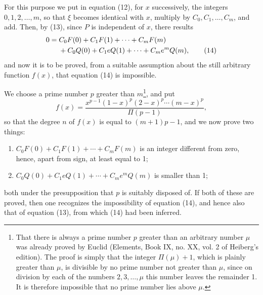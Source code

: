 \documentclass[11pt]{article}
\begin{document}
For this purpose we put in equation (12), for $x$ successively, the integers $0,1,2,\ldots,m$, so that $\xi$ becomes identical with $x$, multiply by $C_0,C_1,\ldots,C_m$, and add. Then, by (13), since $P$ is independent of $x$, there results
\begin{align}
0={}&C_0F(0)+C_1F(1)+\cdots+C_mF(m)\notag\\
&+C_0Q(0)+C_1eQ(1)+\cdots+C_me^mQ(m),\tag{14}
\end{align}
and now it is to be proved, from a suitable assumption about the still arbitrary function $f(x)$, that equation (14) is impossible.

We choose a prime number $p$ greater than $m$\footnote{That there is always a prime number $p$ greater than an arbitrary number $\mu$ was already proved by Euclid (Elements, Book IX, no. XX, vol. 2 of Heiberg's edition). The proof is simply that the integer $\Pi(\mu)+1$, which is plainly greater than $\mu$, is divisible by no prime number not greater than $\mu$, since on division by each of the numbers $2,3,\ldots,\mu$ this number leaves the remainder 1. It is therefore impossible that no prime number lies above $\mu$.}, and put
\begin{equation}\tag{15}
f(x)=\frac{x^{p-1}(1-x)^p(2-x)^p\cdots(m-x)^p}{\Pi(p-1)},
\end{equation}
so that the degree $n$ of $f(x)$ is equal to $(m+1)p-1$, and we now prove two things:
\begin{enumerate}[label=\arabic*)]
\item $C_0F(0)+C_1F(1)+\cdots+C_mF(m)$ is an integer different from zero, hence, apart from sign, at least equal to 1;
\item $C_0Q(0)+C_1eQ(1)+\cdots+C_me^mQ(m)$ is smaller than 1;
\end{enumerate}
both under the presupposition that $p$ is suitably disposed of. If both of these are proved, then one recognizes the impossibility of equation (14), and hence also that of equation (13), from which (14) had been inferred.
\end{document}
